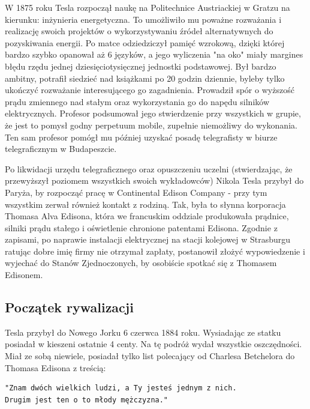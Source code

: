 \documentclass{article}
\begin{document}
\begin{large}
\indent W 1875 roku Tesla rozpoczął naukę na Politechnice Austriackiej w Gratzu na kierunku: inżynieria energetyczna. To umożliwiło mu poważne rozważania i realizację swoich projektów o wykorzystywaniu źródeł alternatywnych do pozyskiwania energii. Po matce odziedziczył pamięć wzrokową, dzięki której bardzo szybko opanował aż 6 języków, a jego wyliczenia "na oko" miały margines błędu rzędu jednej dziesięciotysięcznej jednostki podstawowej. Był bardzo ambitny, potrafił siedzieć nad książkami po 20 godzin dziennie, byleby tylko ukończyć rozważanie interesującego go zagadnienia. Prowadził spór o wyższość prądu zmiennego nad stałym oraz wykorzystania go do napędu silników elektrycznych. Profesor podsumował jego stwierdzenie przy wszystkich w grupie, że jest to pomysł godny perpetuum mobile, zupełnie niemożliwy do wykonania. Ten sam profesor pomógł mu później uzyskać posadę telegrafisty w biurze telegraficznym w Budapeszcie.

\indent Po likwidacji urzędu telegraficznego oraz opuszczeniu uczelni (stwierdzając, że przewyższył poziomem wszystkich swoich wykładowców) Nikola Tesla przybył do Paryża, by rozpocząć pracę w Continental Edison Company - przy tym wszystkim zerwał również kontakt z rodziną. Tak, była to słynna korporacja Thomasa Alva Edisona, która we francuskim oddziale produkowała prądnice, silniki prądu stałego i oświetlenie chronione patentami Edisona. Zgodnie z zapisami, po naprawie instalacji elektrycznej na stacji kolejowej w Strasburgu ratując dobre imię firmy nie otrzymał zapłaty, postanowił złożyć wypowiedzenie i wyjechać do Stanów Zjednoczonych, by osobiście spotkać się z Thomasem Edisonem.
\cite{art:2}

\newpage


\subsection{Początek rywalizacji}

Tesla przybył do Nowego Jorku 6 czerwca 1884 roku. Wysiadając ze statku posiadał w kieszeni ostatnie 4 centy. Na tę podróż wydał wszystkie oszczędności. Miał ze sobą niewiele, posiadał tylko list polecający od Charlesa Betchelora do Thomasa Edisona z treścią:
\\

\begin{verbatim}
"Znam dwóch wielkich ludzi, a Ty jesteś jednym z nich.
Drugim jest ten o to młody mężczyzna."

\end{verbatim}


\end{large}
\end{document}
